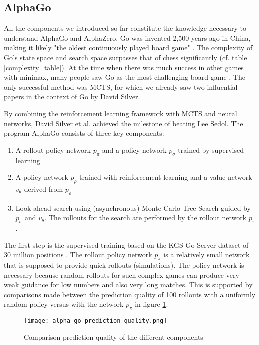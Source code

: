 \subsection{AlphaGo}
All the components we introduced so far constitute the knowledge necessary to understand AlphaGo and AlphaZero. Go was invented 2,500 years ago in China, making it likely "the oldest continuously played board game" \cite{noauthor_go_2022}. The complexity of Go's state space and search space surpasses that of chess significantly (cf. table \ref{complexity_table}). At the time when there was much success in other games with minimax, many people saw Go as the most challenging board game \cite{muller_computer_2002}. The only successful method was MCTS, for which we already saw two influential papers in the context of Go by David Silver.

By combining the reinforcement learning framework with MCTS and neural networks, David Silver et al. achieved the milestone of beating Lee Sedol. The program AlphaGo consists of three key components:

\begin{enumerate}
    \item A rollout policy network $p_{\pi}$ and a policy network $p_{\sigma}$ trained by supervised learning
    \item A policy network $p_{\rho}$ trained with reinforcement learning and a value network $v_{\theta}$ derived from $p_{\rho}$
    \item Look-ahead search using (asynchronous) Monte Carlo Tree Search guided by $p_{\sigma}$ and $v_{\theta}$. The rollouts for the search are performed by the rollout network $p_{\pi}$.
\end{enumerate}

The first step is the supervised training based on the KGS Go Server dataset of 30 million positions \cite[p. 485]{silver_mastering_2016}. The rollout policy network $p_{\pi}$ is a relatively small network that is supposed to provide quick rollouts (simulations). The policy network is necessary because random rollouts for such complex games can produce very weak guidance for low numbers and also very long matches. This is supported by comparisons made between the prediction quality of 100 rollouts with a uniformly random policy versus with the network $p_{\pi}$ in figure \ref{alpha_go_prediction_quality}.

\begin{figure}
    \centering
    \texttt{[image: alpha\_go\_prediction\_quality.png]}
    \caption{Comparison prediction quality of the different components \cite{silver_mastering_2016}}
    \label{alpha_go_prediction_quality}
\end{figure}

